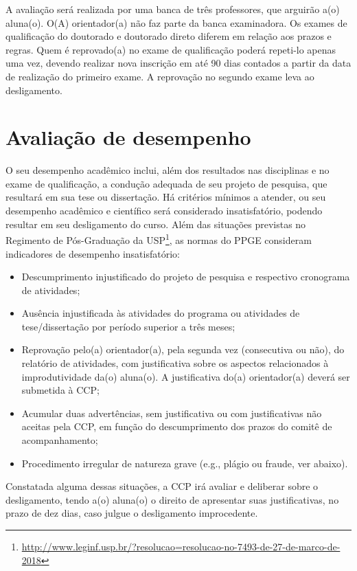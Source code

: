 A avaliação será realizada por uma banca de três professores, que
arguirão a(o) aluna(o). O(A) orientador(a) não faz parte da banca
examinadora. Os exames de qualificação do doutorado e doutorado direto
diferem em relação aos prazos e regras. Quem é reprovado(a) no
exame de qualificação poderá repeti-lo apenas uma vez, devendo
realizar nova inscrição em até 90 dias contados a partir da data de
realização do primeiro exame. A reprovação no segundo exame leva ao
desligamento.


\section{Avaliação de desempenho}
\label{sec:conduta}

O seu desempenho acadêmico inclui, além dos resultados nas disciplinas
e no exame de qualificação, a condução adequada de seu projeto de
pesquisa, que resultará em sua tese ou dissertação. Há critérios
mínimos a atender, ou seu desempenho acadêmico e científico será
considerado insatisfatório, podendo resultar em seu desligamento do
curso. Além das situações previstas no Regimento de Pós-Graduação da
USP\footnote{\url{http://www.leginf.usp.br/?resolucao=resolucao-no-7493-de-27-de-marco-de-2018}},
as normas do PPGE consideram indicadores de desempenho insatisfatório:

\begin{itemize}
\item Descumprimento injustificado do projeto de pesquisa e respectivo
  cronograma de atividades;
\item Ausência injustificada às atividades do programa ou atividades
  de tese/dissertação por período superior a três meses;
\item Reprovação pelo(a) orientador(a), pela segunda vez (consecutiva
  ou não), do relatório de atividades, com justificativa sobre os
  aspectos relacionados à improdutividade da(o) aluna(o). A
  justificativa do(a) orientador(a) deverá ser submetida à CCP;
\item Acumular duas advertências, sem justificativa ou com
  justificativas não aceitas pela CCP, em função do descumprimento dos
  prazos do comitê de acompanhamento;
\item Procedimento irregular de natureza grave (e.g., plágio ou fraude, ver abaixo).
\end{itemize}

Constatada alguma dessas situações, a CCP irá avaliar e deliberar
sobre o desligamento, tendo a(o) aluna(o) o direito de apresentar suas
justificativas, no prazo de dez dias, caso julgue o desligamento
improcedente.

